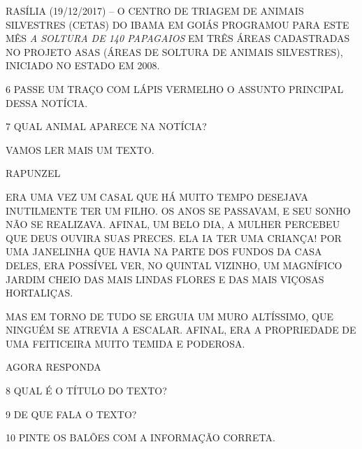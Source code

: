 \begin{escola}
RASÍLIA (19/12/2017) -- O CENTRO DE TRIAGEM DE ANIMAIS SILVESTRES
(CETAS) DO IBAMA EM GOIÁS PROGRAMOU PARA ESTE MÊS \emph{A SOLTURA DE 140
PAPAGAIOS} EM TRÊS ÁREAS CADASTRADAS NO PROJETO ASAS (ÁREAS DE SOLTURA
DE ANIMAIS SILVESTRES), INICIADO NO ESTADO EM 2008.~


\num{6} PASSE UM TRAÇO COM LÁPIS VERMELHO O ASSUNTO PRINCIPAL DESSA NOTÍCIA.

\num{7} QUAL ANIMAL APARECE NA NOTÍCIA?


VAMOS LER MAIS UM TEXTO.

RAPUNZEL

ERA UMA VEZ UM CASAL QUE HÁ MUITO TEMPO DESEJAVA INUTILMENTE TER UM
FILHO. OS ANOS SE PASSAVAM, E SEU SONHO NÃO SE REALIZAVA. AFINAL, UM
BELO DIA, A MULHER PERCEBEU QUE DEUS OUVIRA SUAS PRECES. ELA IA TER UMA
CRIANÇA! POR UMA JANELINHA QUE HAVIA NA PARTE DOS FUNDOS DA CASA DELES,
ERA POSSÍVEL VER, NO QUINTAL VIZINHO, UM MAGNÍFICO JARDIM CHEIO DAS MAIS
LINDAS FLORES E DAS MAIS VIÇOSAS HORTALIÇAS.

MAS EM TORNO DE TUDO SE ERGUIA UM MURO ALTÍSSIMO, QUE NINGUÉM SE ATREVIA
A ESCALAR. AFINAL, ERA A PROPRIEDADE DE UMA FEITICEIRA MUITO TEMIDA E
PODEROSA.


AGORA RESPONDA

\num{8} QUAL É O TÍTULO DO TEXTO?


\num{9} DE QUE FALA O TEXTO?


\num{10} PINTE OS BALÕES COM A INFORMAÇÃO CORRETA.

\begin{multicols}





\end{multicols}
\end{escola}
